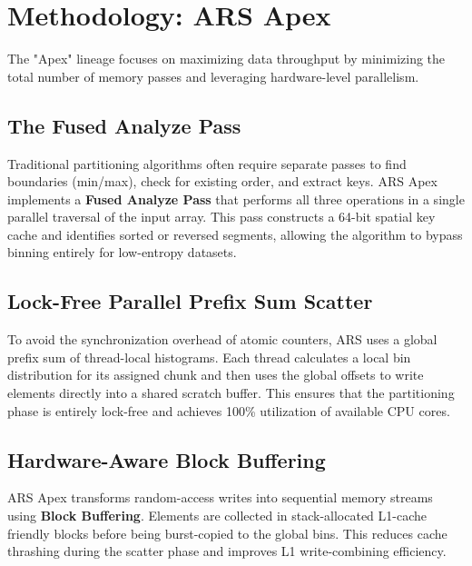 \section{Methodology: ARS Apex}
The "Apex" lineage focuses on maximizing data throughput by minimizing the total number of memory passes and leveraging hardware-level parallelism.

\subsection{The Fused Analyze Pass}
Traditional partitioning algorithms often require separate passes to find boundaries (min/max), check for existing order, and extract keys. ARS Apex implements a \textbf{Fused Analyze Pass} that performs all three operations in a single parallel traversal of the input array. This pass constructs a 64-bit spatial key cache and identifies sorted or reversed segments, allowing the algorithm to bypass binning entirely for low-entropy datasets.

\subsection{Lock-Free Parallel Prefix Sum Scatter}
To avoid the synchronization overhead of atomic counters, ARS uses a global prefix sum of thread-local histograms. Each thread calculates a local bin distribution for its assigned chunk and then uses the global offsets to write elements directly into a shared scratch buffer. This ensures that the partitioning phase is entirely lock-free and achieves 100\% utilization of available CPU cores.

\subsection{Hardware-Aware Block Buffering}
ARS Apex transforms random-access writes into sequential memory streams using \textbf{Block Buffering}. Elements are collected in stack-allocated L1-cache friendly blocks before being burst-copied to the global bins. This reduces cache thrashing during the scatter phase and improves L1 write-combining efficiency.
